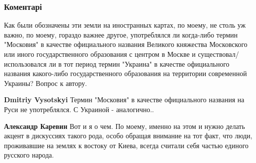  
 
 
 
 
\subsubsection{Коментарі}

\begin{itemize}
 

Как были обозначены эти земли на иностранных картах, по моему, не столь уж
важно, по моему, гораздо важнее другое, употреблялся ли когда-либо термин
"Московия" в качестве официального названия Великого княжества Московского или
иного государственного образования с центром в Москве и
существовал/использовался ли в тот период термин "Украина" в качестве
официального названия какого-либо государственного образования на территории
современной Украины? Вопрос к автору.

\begin{itemize}
 
\textbf{Dmitriy Vysotskyi} Термин "Московия" в качестве официального названия на Руси не употреблялся. С Украиной - аналогично..

 
\textbf{Александр Каревин} Вот и я о чем. По моему, именно на этом и нужно делать акцент в дискуссиях такого рода, особо обращая внимание на тот факт, что люди, проживавшие на землях к востоку от Киева, всегда считали себя частью единого русского народа.


\end{itemize}
\end{itemize}
